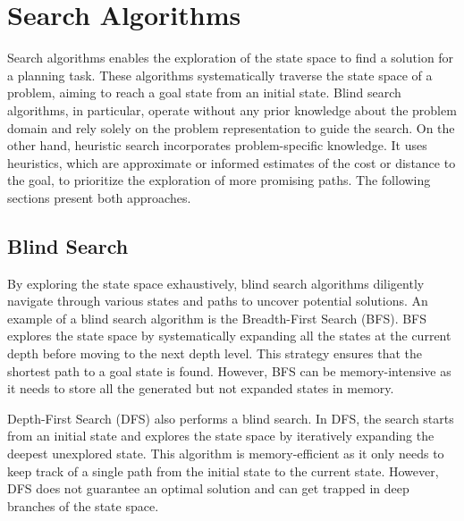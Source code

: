 \section{Search Algorithms}
\label{sec:background_searchalgorithms}

Search algorithms enables the exploration of the state space to find a solution for a planning task. These algorithms systematically traverse the state space of a problem, aiming to reach a goal state from an initial state. Blind search algorithms, in particular, operate without any prior knowledge about the problem domain and rely solely on the problem representation to guide the search. On the other hand, heuristic search incorporates problem-specific knowledge. It uses heuristics, which are approximate or informed estimates of the cost or distance to the goal, to prioritize the exploration of more promising paths. The following sections present both approaches.

\subsection{Blind Search}
\label{sec:background_blindsearch}

By exploring the state space exhaustively, blind search algorithms diligently navigate through various states and paths to uncover potential solutions. An example of a blind search algorithm is the Breadth-First Search (BFS). BFS explores the state space by systematically expanding all the states at the current depth before moving to the next depth level. This strategy ensures that the shortest path to a goal state is found. However, BFS can be memory-intensive as it needs to store all the generated but not expanded states in memory.

Depth-First Search (DFS) also performs a blind search. In DFS, the search starts from an initial state and explores the state space by iteratively expanding the deepest unexplored state. This algorithm is memory-efficient as it only needs to keep track of a single path from the initial state to the current state. However, DFS does not guarantee an optimal solution and can get trapped in deep branches of the state space.

